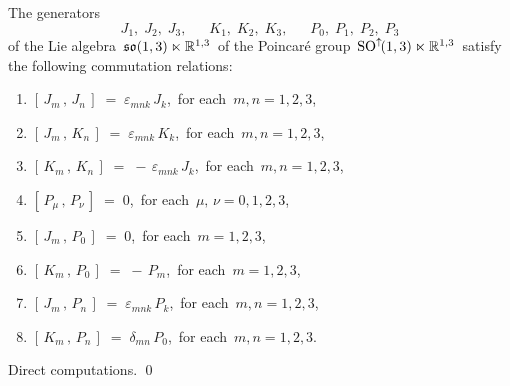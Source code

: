 \vskip 0.5cm
\begin{proposition}
\mbox{}
\vskip 0.1cm
\noindent
The generators
\begin{equation*}
J_{1},\; J_{2},\; J_{3},
\quad\;\;
K_{1},\; K_{2},\; K_{3},
\quad\;\;
P_{0},\; P_{1},\; P_{2},\; P_{3}
\end{equation*}
of the Lie algebra
\,$\mathfrak{so}(1,3) \ltimes \mathbb{R}^{1,3}$\,
of the Poincaré group
\,$\textnormal{SO}^{\uparrow\!}(1,3) \ltimes \mathbb{R}^{1,3}$\,
satisfy the following commutation relations:
\begin{enumerate}
\item
	$\left[\,J_{m}\,,\,J_{n}\,\right] \; = \; \varepsilon_{mnk}\,J_{k}$,\,
	for each \,$m, n = 1,2,3$,
\item
	\vskip -0.1cm
	$\left[\,J_{m}\,,\,K_{n}\,\right] \; = \; \varepsilon_{mnk}\,K_{k}$,\,
	for each \,$m, n = 1,2,3$,
\item
	\vskip -0.1cm
	$\left[\,K_{m}\,,\,K_{n}\,\right] \; = \; -\,\varepsilon_{mnk}\,J_{k}$,\,
	for each \,$m, n = 1,2,3$,
\item
	\vskip 0.2cm
	$\left[\,P_{\mu}\,,\,P_{\nu}\,\right] \; = \; 0$,\,
	for each \,$\mu,\, \nu = 0,1,2,3$,
\item
	\vskip 0.2cm
	$\left[\,J_{m}\,,\,P_{0}\,\right] \; = \; 0$,\,
	for each \,$m = 1,2,3$,
\item
	\vskip -0.1cm
	$\left[\,K_{m}\,,\,P_{0}\,\right] \; = \; -\,P_{m}$,\,
	for each \,$m = 1,2,3$,
\item
	\vskip -0.1cm
	$\left[\,J_{m}\,,\,P_{n}\,\right] \; = \; \varepsilon_{mnk}\,P_{k}$,\,
	for each \,$m, n = 1,2,3$,
\item
	\vskip -0.1cm
	$\left[\,K_{m}\,,\,P_{n}\,\right] \; = \; \delta_{mn}\,P_{0}$,\,
	for each \,$m, n = 1,2,3$.
\end{enumerate}
\end{proposition}
\proof
Direct computations.
\qed


